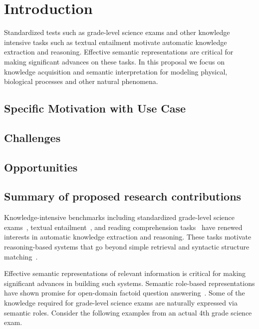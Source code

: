 \section{Introduction}

Standardized tests such as grade-level science exams and other knowledge intensive tasks such as textual entailment motivate automatic knowledge extraction and reasoning. Effective semantic representations are critical for making significant advances on these tasks. In this proposal we focus on 
knowledge acquisition and semantic interpretation for modeling physical, biological processes and other natural phenomena.

\subsection{Specific Motivation with Use Case}

\subsection{Challenges}

\subsection{Opportunities}

\subsection{Summary of proposed research contributions}


Knowledge-intensive benchmarks including standardized grade-level science exams~\cite{clark2015elementary}, 
textual entailment~\cite{dagan2010recognizing}, and reading comprehension tasks~\cite{richardson2013mctest} have renewed interests in automatic knowledge extraction and reasoning. 
These tasks motivate reasoning-based systems that go beyond simple retrieval and syntactic structure matching~\cite{clark2014:akbc,chb2013:akbc, khot2015:emlnlp}. 

Effective semantic representations of relevant information is critical for making significant advances in building such systems. 
Semantic role-based representations have shown promise for open-domain factoid question answering~\cite{shen2007using, pizzato2008indexing}. 
Some of the knowledge required for grade-level science exams are naturally expressed via semantic roles.
Consider the following examples from an actual 4th grade science exam.

